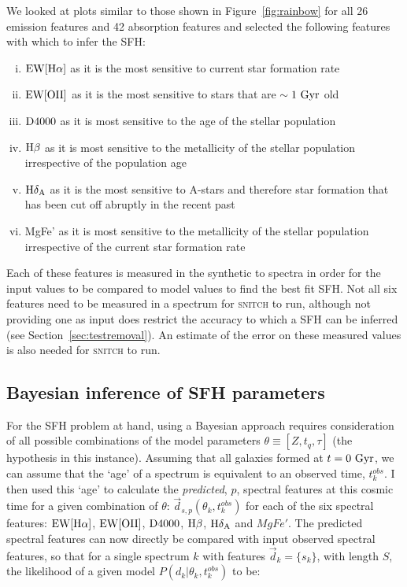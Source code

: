 \documentclass[useAMS,usenatbib]{mn2e}
\begin{document}
We looked at plots similar to those shown in Figure~\ref{fig:rainbow} for all 26 emission features and 42 absorption features and selected the following features with which to infer the SFH:
\begin{enumerate}[(i)]
\item $\rm{EW}[H\alpha]$ as it is the most sensitive to current star formation rate

\item $\rm{EW}[OII]$ as it is the most sensitive to stars that are $\sim 1~\rm{Gyr}$ old

\item $\rm{D}4000$ as it is most sensitive to the age of the stellar population

\item $\rm{H}\beta$ as it is most sensitive to the metallicity of the stellar population irrespective of the population age

\item $\rm{H}\delta_A$ as it is the most sensitive to A-stars and therefore star formation that has been cut off abruptly in the recent past

\item MgFe' as it is most sensitive to the metallicity of the stellar population irrespective of the current star formation rate
\end{enumerate}

Each of these features is measured in the synthetic to spectra in order for the input values to be compared to model values to find the best fit SFH. Not all six features need to be measured in a spectrum for \textsc{snitch} to run, although not providing one as input does restrict the accuracy to which a SFH can be inferred (see Section~\ref{sec:testremoval}). An estimate of the error on these measured values is also needed for \textsc{snitch} to run. 


\subsection{Bayesian inference of SFH parameters}\label{sec:emcee}

For the SFH problem at hand, using a Bayesian approach requires consideration of all possible combinations of the model parameters $\theta \equiv [Z, t_{q}, \tau]$ (the hypothesis in this instance). Assuming that all galaxies formed at $t=0~\rm{Gyr}$, we can assume that the `age' of a spectrum is equivalent to an observed time, $t^{obs}_{k}$. I then used this  `age' to calculate the \emph{predicted}, $p$, spectral features at this cosmic time for a given combination of $\theta$: $\vec{d}_{s,p}(\theta_k, t^{obs}_{k})$ for each of the six spectral features: $\rm{EW}[H\alpha]$, $\rm{EW}[OII]$, $\rm{D}4000$, $\rm{H}\beta$, $\rm{H}\delta_A$ and $MgFe'$. The predicted spectral features can now directly be compared with input observed spectral features, so that for a single spectrum $k$ with features $\vec{d}_{k} = \{s_k\}$, with length $S$, the likelihood of a given model $P(d_{k}|\theta_k, t^{obs}_{k})$ to be:
\end{document}
